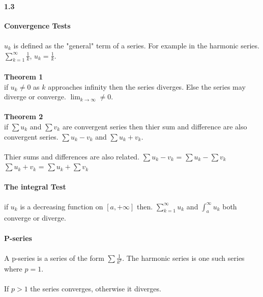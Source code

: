 \documentclass[14pt]{extreport}
\begin{document}
\paragraph{1.3}\textbf{Convergence Tests}\\\\

$u_k$ is defined as the "general" term of a series. For example in the harmonic series. $\sum_{k=1}^{\infty} \frac{1}{k}$, $u_k=\frac{1}{k}$.\\\\

\textbf{Theorem 1}\\
if $u_k \ne 0$ as $k$ approaches infinity then the series diverges. Else the series may diverge or converge. $\lim_{k \to \infty} \ne 0$.\\\\

\textbf{Theorem 2}\\
if $\sum u_k$ and $\sum v_k$ are convergent series then thier sum and difference are also convergent series. $\sum u_k - v_k$ and $\sum u_k + v_k$.\\\\

Thier sums and differences are also related.
$\sum u_k - v_k$ = $\sum u_k - \sum v_k$\\

$\sum u_k + v_k$ = $\sum u_k + \sum v_k$\\\\


\textbf{The integral Test}\\\\
if $u_k$ is a decreasing function on $[a, +\infty]$ then. $\sum_{k=1}^{\infty} u_k$ and $\int_{a}^{\infty} u_k$ both converge or diverge.\\\\


\textbf{P-series}\\\\
A p-series is a series of the form $\sum \frac{1}{k^p}$. The harmonic series is one such series where $p=1$.\\\\

If $p > 1$ the series converges, otherwise it diverges. 
\end{document}
